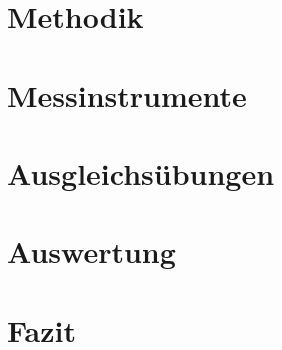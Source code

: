 \section{Methodik}


\section{Messinstrumente}


\section{Ausgleichsübungen}


\section{Auswertung}


\section{Fazit}


% 



